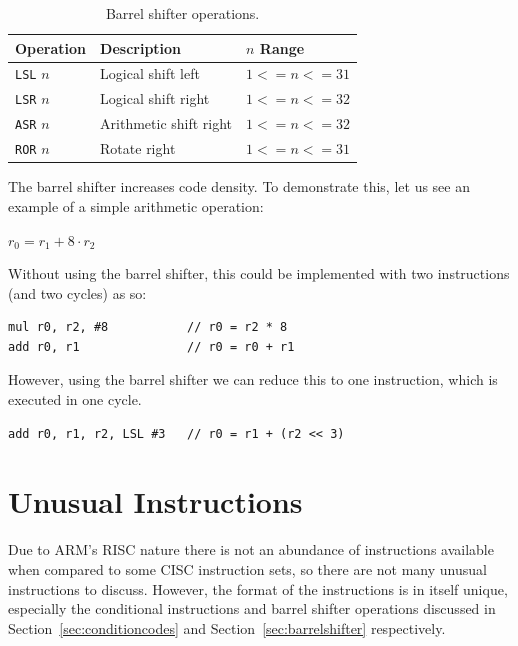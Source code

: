\documentclass[oneside,a4paper]{report}
\begin{document}
\begin{table}[htb]
	\centering
	\begin{tabular}{lll}
		\toprule
		Operation		&	Description				&	$n$ Range		\\
		\midrule
		\texttt{LSL}	$n$			&	Logical shift left		&	$1 <= n <= 31$	\\
		\texttt{LSR}	$n$			&	Logical shift right		&	$1 <= n <= 32$	\\
		\texttt{ASR}	$n$			&	Arithmetic shift right	&	$1 <= n <= 32$	\\
		\texttt{ROR}	$n$			&	Rotate right			&	$1 <= n <= 31$	\\
		\bottomrule
	\end{tabular}
	\caption{Barrel shifter operations. \cite[p. A8-10]{ARMRef}}
	\label{tab:shifts}
\end{table}

The barrel shifter increases code density. To demonstrate this, let us see an example of a simple arithmetic operation:

$r_0 = r_1 + 8\cdot{}r_2$

Without using the barrel shifter, this could be implemented with two instructions (and two cycles) as so:

\begin{singlespacing}
\begin{lstlisting}[language={[ARM]Assembler}]
mul r0, r2, #8           // r0 = r2 * 8
add r0, r1               // r0 = r0 + r1
\end{lstlisting}
\end{singlespacing}

However, using the barrel shifter we can reduce this to one instruction, which is executed in one cycle.

\begin{lstlisting}[language={[ARM]Assembler}]
add r0, r1, r2, LSL #3   // r0 = r1 + (r2 << 3)
\end{lstlisting}

\chapter{Unusual Instructions}

Due to ARM's RISC nature there is not an abundance of instructions available when compared to some CISC instruction sets, so there are not many unusual instructions to discuss. However, the format of the instructions is in itself unique, especially the conditional instructions and barrel shifter operations discussed in Section~\ref{sec:conditioncodes} and Section~\ref{sec:barrelshifter} respectively.
\end{document}
